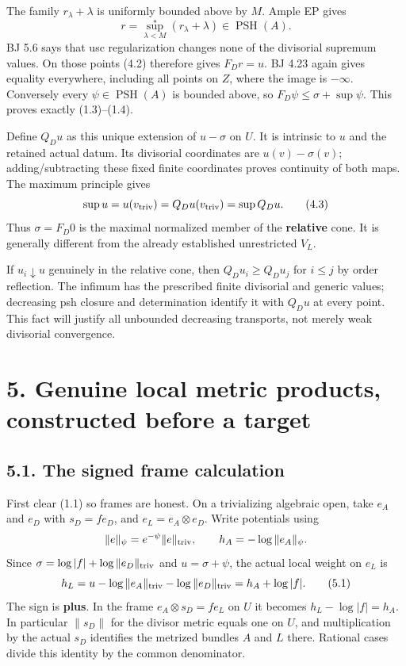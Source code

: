 \documentclass[
  10pt,
]{article}
\begin{document}
The family \(r_\lambda+\lambda\) is uniformly bounded above by \(M\).
Ample EP gives \[
                r=\sup^*_{\lambda<M}(r_\lambda+\lambda)
                                      \in\operatorname{PSH}(A).
\] BJ 5.6 says that usc regularization changes none of the divisorial
supremum values. On those points (4.2) therefore gives \(F_Dr=u\). BJ
4.23 again gives equality everywhere, including all points on \(Z\),
where the image is \(-\infty\). Conversely every
\(\psi\in\operatorname{PSH}(A)\) is bounded above, so
\(F_D\psi\leq\sigma+\sup\psi\). This proves exactly (1.3)--(1.4).

Define \(Q_Du\) as this unique extension of \(u-\sigma\) on \(U\). It is
intrinsic to \(u\) and the retained actual datum. Its divisorial
coordinates are \(u(v)-\sigma(v)\); adding/subtracting these fixed
finite coordinates proves continuity of both maps. The maximum principle
gives \[
 \sup u=u(v_{\rm triv})=Q_Du(v_{\rm triv})=\sup Q_Du.          \tag{4.3}
\] Thus \(\sigma=F_D0\) is the maximal normalized member of the
\textbf{relative} cone. It is generally different from the already
established unrestricted \(V_L\).

If \(u_i\downarrow u\) genuinely in the relative cone, then
\(Q_Du_i\geq Q_Du_j\) for \(i\leq j\) by order reflection. The infimum
has the prescribed finite divisorial and generic values; decreasing psh
closure and determination identify it with \(Q_Du\) at every point. This
fact will justify all unbounded decreasing transports, not merely weak
divisorial convergence.

\section{5. Genuine local metric products, constructed before a
target}\label{genuine-local-metric-products-constructed-before-a-target}

\subsection{5.1. The signed frame
calculation}\label{the-signed-frame-calculation}

First clear (1.1) so frames are honest. On a trivializing algebraic
open, take \(e_A\) and \(e_D\) with \(s_D=f e_D\), and
\(e_L=e_A\otimes e_D\). Write potentials using \[
 \|e\|_\psi=e^{-\psi}\|e\|_{\rm triv},\qquad
                 h_A=-\log\|e_A\|_\psi.
\] Since \(\sigma=\log|f|+\log\|e_D\|_{\rm triv}\) and
\(u=\sigma+\psi\), the actual local weight on \(e_L\) is \[
 h_L=u-\log\|e_A\|_{\rm triv}-\log\|e_D\|_{\rm triv}
                         =h_A+\log|f|.                        \tag{5.1}
\] The sign is \textbf{plus}. In the frame \(e_A\otimes s_D=f e_L\) on
\(U\) it becomes \(h_L-\log|f|=h_A\). In particular \(\|s_D\|\) for the
divisor metric equals one on \(U\), and multiplication by the actual
\(s_D\) identifies the metrized bundles \(A\) and \(L\) there. Rational
cases divide this identity by the common denominator.
\end{document}
